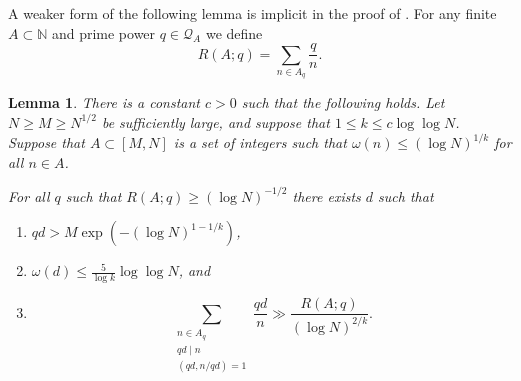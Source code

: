 \documentclass[12pt]{amsart}
\newcommand{\bbn}{\mathbb{N}}
\newtheorem{lemma}{Lemma}
\begin{document}
A weaker form of the following lemma is implicit in the proof of \cite[Proposition 3]{Cr2003}. For any finite $A\subset \bbn$ and prime power $q\in\mathcal{Q}_A$ we define\label{def-raq}
\[R(A;q) = \sum_{n\in A_q}\frac{q}{n}.\]
\begin{lemma}\label{lem-usingq}
There is a constant $c>0$ such that the following holds. Let $N\geq M\geq N^{1/2}$ be sufficiently large, and suppose that $1\leq k \leq c\log\log N$. Suppose that $A\subset [M,N]$ is a set of integers such that $\omega(n)\leq (\log N)^{1/k}$ for all $n\in A$. 

For all $q$ such that $R(A;q)\geq (\log N)^{-1/2}$ there exists $d$ such that
\begin{enumerate}
\item $qd > M\exp(-(\log N)^{1-1/k})$,
\item $\omega(d)\leq \tfrac{5}{\log k}\log\log N$, and
\item \[\sum_{\substack{n\in A_q\\qd\mid n\\ (qd,n/qd)=1}}\frac{qd}{n}\gg \frac{R(A;q)}{(\log N)^{2/k}}.\]
\end{enumerate}
\end{lemma}
\end{document}
